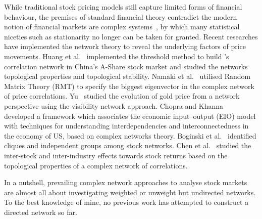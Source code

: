 While traditional stock pricing models still capture limited forms of financial behaviour, the premises of standard financial theory contradict the modern notion of financial markets are complex systems~\cite{financialcomplex}, by which many statistical niceties such as stationarity no longer can be taken for granted. Recent researches have implemented the network theory to reveal the underlying factors of price movements. Huang et al.~\cite{chinesenetwork} implemented the threshold method to build ’s correlation network in China's A-Share stock market and studied the networks topological properties and topological stability. Namaki et al.~\cite{genuine} utilised Random Matrix Theory (RMT) to specify the biggest eigenvector in the complex network of price correlations. Yu~\cite{visibility} studied the evolution of gold price from a network perspective using the visibility network approach. Chopra and Khanna~\cite{intercd} developed a framework which associates the economic input–output (EIO) model with techniques for understanding interdependencies and interconnectedness in the economy of US, based on complex networks theory. Boginski et al.~\cite{statisticalanalysis} identified cliques and independent groups among stock networks. Chen et al.~\cite{CHEN2015224} studied the inter-stock and inter-industry effects towards stock returns based on the topological properties of a complex network of correlations.

In a nutshell, prevailing complex network approaches to analyse stock markets are almost all about investigating weighted or unweight but undirected networks. To the best knowledge of mine, no previous work has attempted to construct a directed network so far.
